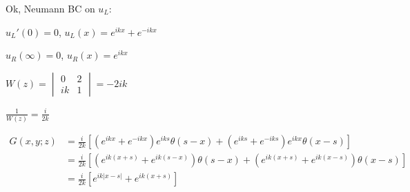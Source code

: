 \documentclass[12pt, a4paper]{article}
\begin{document}
Ok, Neumann BC on $u_L$:

$u_L'(0) = 0$, $u_L(x) = e^{ikx} + e^{-ikx}$

$u_R(\infty) = 0$, $u_R(x) = e^{ikx}$

$W(z) = \begin{vmatrix} 0 & 2\\ ik & 1 \end{vmatrix} = -2 i k$

$\frac{1}{W(z)} = \frac{i}{2k}$

\begin{align*}
G(x, y; z)
&= \frac{i}{2k} [(e^{ikx} + e^{-ikx}) e^{iks} \theta(s - x) +  (e^{iks} + e^{-iks}) e^{ikx} \theta(x - s)] \\
&= \frac{i}{2k} [(e^{ik(x + s)} + e^{ik(s - x)}) \theta(s - x) + (e^{ik(x + s)} + e^{ik (x - s)}) \theta(x - s)] \\
&= \frac{i}{2k} [e^{ik|x - s|} + e^{ik (x + s)}]
\end{align*}
\end{document}
